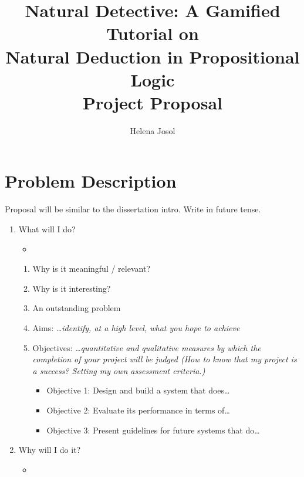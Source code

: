 \documentclass[a4paper]{article}
\title{Natural Detective: A Gamified Tutorial on \\ Natural Deduction in Propositional Logic \\
  \medskip \Large{Project Proposal}}
\author{Helena Josol}
\date{}
\begin{document}
\maketitle


\section{Problem Description} %
Proposal will be similar to the dissertation intro. Write in future tense.
\begin{enumerate}
  \item What will I do?
    \begin{itemize}
      \item {}
    \end{itemize}
    \begin{enumerate}
      \item Why is it meaningful / relevant?
      \item Why is it interesting?
      \item An outstanding problem
      \item Aims: \textit{\dots identify, at a high level, what you hope to achieve}
      \item Objectives: \textit{\dots quantitative and qualitative measures by which the completion of your project will be judged (How to know that my project is a success? Setting my own assessment criteria.)}
        \begin{itemize}
          \item Objective 1: Design and build a system that does\dots
          \item Objective 2: Evaluate its performance in terms of\dots
          \item Objective 3: Present guidelines for future systems that do\dots
        \end{itemize}
    \end{enumerate}
  \item Why will I do it?
    \begin{itemize}
      \item {}
      \begin{itemize}

\end{itemize}
\end{itemize}
\end{enumerate}
\end{document}
